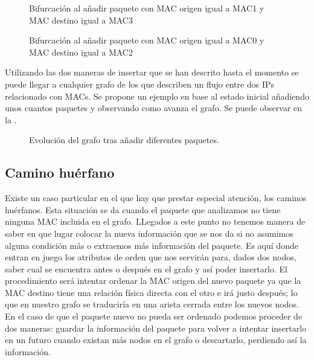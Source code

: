 \documentclass[twoside, 12pt]{epstfg}
\begin{document}
\begin{figure}
\centering

\caption[Ejemplo de bifurcación 1]{Bifurcación al añadir paquete con MAC origen igual a MAC1 y MAC destino igual a MAC3}
\label{fig:Analisis:Bifurcation1}
\end{figure}

\begin{figure}
\centering

\caption[Ejemplo de bifurcación 2]{Bifurcación al añadir paquete con MAC origen igual a MAC0 y MAC destino igual a MAC2}
\label{fig:Analisis:Bifurcation2}
\end{figure}

Utilizando las dos maneras de insertar que se han descrito hasta el momento se puede llegar a cualquier grafo de los que describen un flujo entre dos IPs relacionado con MACs. Se propone un ejemplo en base al estado inicial añadiendo unos cuantos paquetes y observando como avanza el grafo. Se puede observar en la .%

\begin{figure}
\centering

\caption[Ejemplo de superflujo compuesto]{Evolución del grafo tras añadir diferentes paquetes.}
\label{fig:Analisis:ComplexFlow}
\end{figure}

\newpage
\subsection{Camino huérfano}

Existe un caso particular en el que hay que prestar especial atención, los caminos huérfanos. Esta situación se da cuando el paquete que analizamos no tiene ninguna MAC incluida en el grafo. LLegados a este punto no tenemos manera de saber en que lugar colocar la nueva información que se nos da si no asumimos alguna condición más o extraemos más información del paquete. Es aquí donde entran en juego los atributos de orden que nos servirán para, dados dos nodos, saber cual se encuentra antes o después en el grafo y así poder insertarlo. El procedimiento será intentar ordenar la MAC origen del nuevo paquete ya que la MAC destino tiene una relación física directa con el otro e irá justo después; lo que en nuestro grafo se traduciría en una arista cerrada entre los nuevos nodos. En el caso de que el paquete nuevo no pueda ser ordenado podemos proceder de dos maneras: guardar la información del paquete para volver a intentar insertarlo en un futuro cuando existan más nodos en el grafo o descartarlo, perdiendo así la información.
\end{document}
